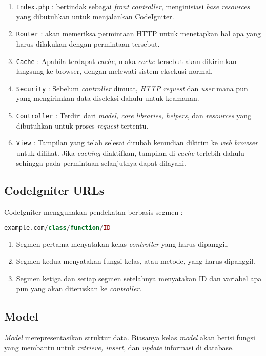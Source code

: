 \begin{enumerate}
\item \texttt{Index.php} : bertindak sebagai \textit{front controller}, menginisiasi \textit{base resources} yang dibutuhkan untuk menjalankan CodeIgniter.
\item \texttt{Router} : akan memeriksa permintaan HTTP untuk menetapkan hal apa yang harus dilakukan dengan permintaan tersebut.
\item \texttt{Cache} : Apabila terdapat \textit{cache}, maka \textit{cache} tersebut akan dikirimkan langsung ke browser, dengan melewati sistem eksekusi normal.
\item \texttt{Security} : Sebelum \textit{controller} dimuat, \textit{HTTP request} dan \textit{user} mana pun yang mengirimkan data diseleksi dahulu untuk keamanan.
\item \texttt{Controller} : Terdiri dari \textit{model, core libraries, helpers}, dan \textit{resources} yang dibutuhkan untuk proses \textit{request} tertentu.
\item \texttt{View} : Tampilan yang telah selesai dirubah kemudian dikirim ke \textit{web browser} untuk dilihat. Jika \textit{caching} diaktifkan, tampilan di \textit{cache} terlebih dahulu sehingga pada permintaan selanjutnya dapat dilayani.\cite{codeigniter}
\end{enumerate}

\subsection{CodeIgniter URLs}
\label{subs:urls}
CodeIgniter menggunakan pendekatan berbasis segmen :
\begin{lstlisting}[frame=single, language=PHP] 
example.com/class/function/ID
\end{lstlisting}

\begin{enumerate}
\item Segmen pertama menyatakan kelas \textit{controller} yang harus dipanggil.
\item Segmen kedua menyatakan fungsi kelas, atau metode, yang harus dipanggil.
\item Segmen ketiga dan setiap segmen setelahnya menyatakan ID dan variabel apa pun yang akan diteruskan ke \textit{controller}.
\end{enumerate}

\subsection{Model}
\label{subs:model}
\textit{Model} merepresentasikan struktur data. Biasanya kelas \textit {model} akan berisi fungsi yang membantu untuk \textit{retrieve, insert}, dan \textit{update} informasi di database.

